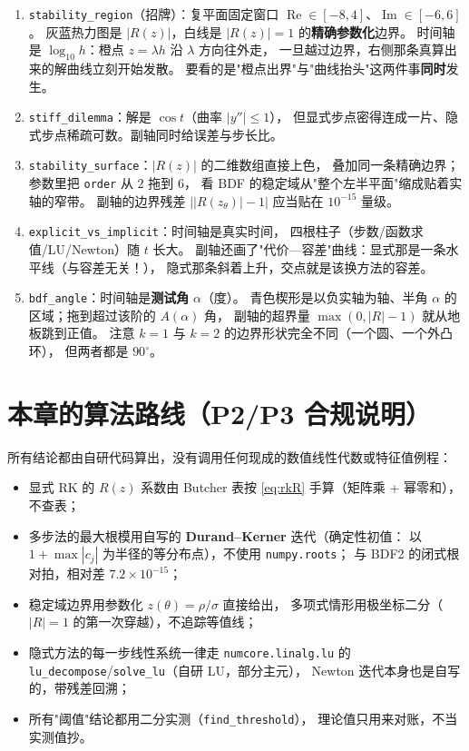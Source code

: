 \begin{enumerate}
  \item \texttt{stability\_\allowbreak{}region}（招牌）：复平面固定窗口
        $\operatorname{Re}\in[-8,4]$、$\operatorname{Im}\in[-6,6]$。
        灰蓝热力图是 $|R(z)|$，白线是 $|R(z)|=1$ 的\textbf{精确参数化}边界。
        时间轴是 $\log_{10}h$：橙点 $z=\lambda h$ 沿 $\lambda$ 方向往外走，
        一旦越过边界，右侧那条真算出来的解曲线立刻开始发散。
        要看的是"橙点出界"与"曲线抬头"这两件事\textbf{同时}发生。
  \item \texttt{stiff\_\allowbreak{}dilemma}：解是 $\cos t$（曲率 $|y''|\le1$），
        但显式步点密得连成一片、隐式步点稀疏可数。副轴同时给误差与步长比。
  \item \texttt{stability\_\allowbreak{}surface}：$|R(z)|$ 的二维数组直接上色，
        叠加同一条精确边界；参数里把 \texttt{order} 从 $2$ 拖到 $6$，
        看 BDF 的稳定域从"整个左半平面"缩成贴着实轴的窄带。
        副轴的边界残差 $\bigl||R(z_\theta)|-1\bigr|$ 应当贴在 $10^{-15}$ 量级。
  \item \texttt{explicit\_\allowbreak{}vs\_\allowbreak{}implicit}：时间轴是真实时间，
        四根柱子（步数/函数求值/LU/Newton）随 $t$ 长大。
        副轴还画了"代价—容差"曲线：显式那是一条水平线（与容差无关！），
        隐式那条斜着上升，交点就是该换方法的容差。
  \item \texttt{bdf\_\allowbreak{}angle}：时间轴是\textbf{测试角} $\alpha$（度）。
        青色楔形是以负实轴为轴、半角 $\alpha$ 的区域；拖到超过该阶的 $A(\alpha)$ 角，
        副轴的超界量 $\max(0,|R|-1)$ 就从地板跳到正值。
        注意 $k=1$ 与 $k=2$ 的边界形状完全不同（一个圆、一个外凸环），
        但两者都是 $90^\circ$。
\end{enumerate}

\section{本章的算法路线（P2/P3 合规说明）}

所有结论都由自研代码算出，没有调用任何现成的数值线性代数或特征值例程：

\begin{itemize}
  \item 显式 RK 的 $R(z)$ 系数由 Butcher 表按 \eqref{eq:rkR} 手算（矩阵乘 + 幂零和），
        不查表；
  \item 多步法的最大根模用自写的 \textbf{Durand--Kerner} 迭代（确定性初值：
        以 $1+\max|c_j|$ 为半径的等分布点），不使用 \texttt{numpy.roots}；
        与 BDF2 的闭式根对拍，相对差 $7.2\times10^{-15}$；
  \item 稳定域边界用参数化 $z(\theta)=\rho/\sigma$ 直接给出，
        多项式情形用极坐标二分（$|R|=1$ 的第一次穿越），不追踪等值线；
  \item 隐式方法的每一步线性系统一律走 \texttt{numcore.linalg.lu} 的
        \texttt{lu\_decompose}/\texttt{solve\_lu}（自研 LU，部分主元），
        Newton 迭代本身也是自写的，带残差回溯；
  \item 所有"阈值"结论都用二分实测（\texttt{find\_threshold}），
        理论值只用来对账，不当实测值抄。
\end{itemize}

